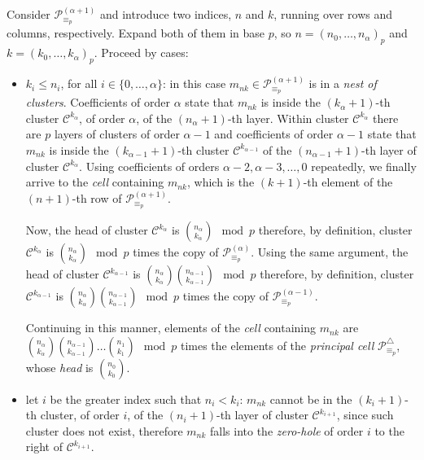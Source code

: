 Consider $\mathcal{P}_{\equiv_{p}}^{(\alpha+1)}$ and introduce 
two indices, $n$ and $k$, running over rows and columns, respectively.
Expand both of them in base $p$, so $n=(n_{0},\ldots,n_{\alpha})_{p}$ and 
$k=(k_{0},\ldots,k_{\alpha})_{p}$. Proceed by cases:
\begin{itemize}

    \item $k_{i}\leq n_{i}$, for all $i\in\lbrace0,\ldots,\alpha\rbrace$: in
    this case $m_{nk}\in\mathcal{P}_{\equiv_{p}}^{(\alpha+1)}$ is in a
    \emph{nest of clusters}.  Coefficients of order $\alpha$ state that
    $m_{nk}$ is inside the $(k_{\alpha}+1)$-th cluster
    $\mathcal{C}^{k_{\alpha}}$, of order $\alpha$, of the $(n_{\alpha}+1)$-th
    layer.  Within cluster $\mathcal{C}^{k_{\alpha}}$ there are $p$ layers of
    clusters of order $\alpha-1$ and coefficients of order $\alpha-1$ state
    that $m_{nk}$ is inside the $(k_{\alpha-1}+1)$-th cluster
    $\mathcal{C}^{k_{\alpha-1}}$ of the $(n_{\alpha-1}+1)$-th layer of cluster
    $\mathcal{C}^{k_{\alpha}}$. Using coefficients of orders
    $\alpha-2,\alpha-3,\ldots,0$ repeatedly, we finally arrive to the
    \emph{cell} containing $m_{nk}$, which is the $(k+1)$-th element of the
    $(n+1)$-th row of $\mathcal{P}_{\equiv_{p}}^{(\alpha+1)}$.

    Now, the head of cluster $\mathcal{C}^{k_{\alpha}}$ is
    ${{n_{\alpha}}\choose{k_{\alpha}}}\mod p$ therefore, by definition, cluster
    $\mathcal{C}^{k_{\alpha}}$ is ${{n_{\alpha}}\choose{k_{\alpha}}}\mod p$
    times the copy of $\mathcal{P}_{\equiv_{p}}^{(\alpha)}$.  Using the same
    argument, the head of cluster $\mathcal{C}^{k_{\alpha-1}}$ is
    ${{n_{\alpha}}\choose{k_{\alpha}}}{{n_{\alpha-1}}\choose{k_{\alpha-1}}}\mod
    p$ therefore, by definition, cluster $\mathcal{C}^{k_{\alpha-1}}$ is
    ${{n_{\alpha}}\choose{k_{\alpha}}}{{n_{\alpha-1}}\choose{k_{\alpha-1}}}\mod
    p$ times the copy of $\mathcal{P}_{\equiv_{p}}^{(\alpha-1)}$.

    Continuing in this manner, elements of the \emph{cell} containing $m_{nk}$
    are ${{n_{\alpha}}\choose{k_{\alpha}}}{{n_{\alpha-1}}\choose
    {k_{\alpha-1}}}\ldots{{n_{1}}\choose{k_{1}}}\mod p$ times the elements of 
    the \emph{principal cell} $\mathcal{P}_{\equiv_{p}}^{\bigtriangleup}$, whose
    \emph{head} is ${{n_{0}}\choose{k_{0}}}$. 

    \item let $i$ be the greater index such that $n_{i}<k_{i}$: $m_{nk}$ cannot
    be in the $(k_{i}+1)$-th cluster, of order $i$, of the $(n_{i}+1)$-th layer
    of cluster $\mathcal{C}^{k_{i+1}}$, since such cluster does not exist,
    therefore $m_{nk}$ falls into the \emph{zero-hole} of order $i$ to the
    right of $\mathcal{C}^{k_{i+1}}$.

\end{itemize}


